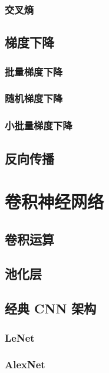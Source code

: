 \documentclass[12pt,UTF8]{ctexbook}
\begin{document}
\subsection{交叉熵}

\section{梯度下降}

\subsection{批量梯度下降}

\subsection{随机梯度下降}

\subsection{小批量梯度下降}

\section{反向传播}

\chapter{卷积神经网络}
\label{chap:cnn}

\section{卷积运算}

\section{池化层}

\section{经典 CNN 架构}

\subsection{LeNet}

\subsection{AlexNet}
\end{document}
